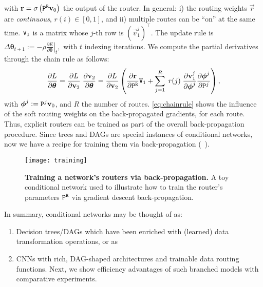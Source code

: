 \documentclass[thesis]{subfiles}
\begin{document}
	with $\vec r= \sigma \left( \mat P^{\tt R} \vec v_0 \right)$ the output of the router.
	In general: 
	i) the routing weights $\vec r$ are {\em continuous}, $r(i)\in[0,1]$, and
	ii) multiple routes can be ``on'' at the same time.
	$\mat V_1$ is a matrix whose $j$-th row is $(\vec v_1^j) ^\top$.
	The update rule is
	$
	\Delta \boldsymbol\theta_{t+1}  := -\rho \left. \frac{\partial E}{\partial \boldsymbol\theta} \right|_t,
	$ with $t$ indexing iterations. We compute the partial derivatives through the chain rule as follows:
	\begin{equation}
	\frac{\partial L}{\partial \boldsymbol\theta} = 
	\frac{\partial L}{\partial \vec v_2} \; 
	\frac{\partial \vec v_2}{\partial \boldsymbol\theta} = 
	\frac{\partial L}{\partial \vec v_2} \left( 
	\frac{\partial \vec r}{\partial \mat P^{\tt R}} \mat V_1 +  
	\sum_{j=1}^{R} \;r(j)\; 
	\frac{\partial \vec v_1^j}{\partial \boldsymbol\phi^j} 
	\frac{\partial \boldsymbol\phi^j}{\partial \mat P^j}\right)
	\label{eq:chainrule},
	\end{equation}
	with $\boldsymbol{\phi}^j := \mat P^j \vec v_0$, and $R$ the number of routes. 
	\cref{eq:chainrule} shows the influence of the soft routing weights on the 
	back-propagated gradients, for each route.
	Thus, explicit routers can be trained as part of the overall back-propagation procedure. 
	Since trees and DAGs are special instances of conditional networks, 
	now we have a recipe for training them via back-propagation (\cf~\cite{Kontschieder2015,Schulter2013Alternating,Suarez1999GlobalTree}).
	
	
	\begin{figure}[tbp]
	\centerline{
	\texttt{[image: training]}
	}
	   \caption[Training a network's routers via back-propagation]{{\bf Training a network's routers via back-propagation.} 
	   A toy conditional network used to illustrate how to train the router's parameters $\mat P^{\tt R}$ via gradient descent back-propagation.}
	\label{fig:training}
	\end{figure}
	
	In summary, conditional networks may be thought of as:
	\begin{enumerate}
	\item Decision trees/DAGs which have been enriched with (learned) data transformation operations, or as
	\item CNNs with rich, DAG-shaped architectures and trainable data routing functions. 
	Next, we show efficiency advantages of such branched models with comparative experiments.
	\end{enumerate}
	
\end{document}
